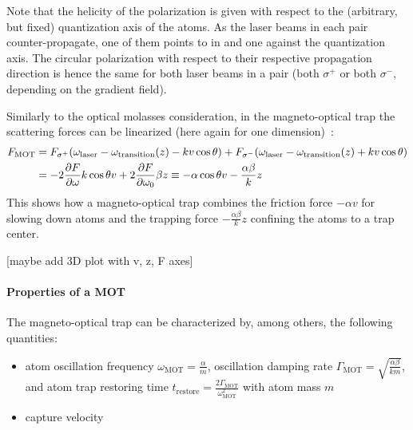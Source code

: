 Note that the helicity of the polarization is given with respect to the (arbitrary, but fixed) quantization axis of the atoms. As the laser beams in each pair counter-propagate, one of them points to in and one against the quantization axis. The circular polarization with respect to their respective propagation direction is hence the same for both laser beams in a pair (both $\sigma^+$ or both $\sigma^-$, depending on the gradient field).


Similarly to the optical molasses consideration, in the magneto-optical trap the scattering forces can be linearized (here again for one dimension)~\cite{foot_atomic_2005}:
\begin{equation}
    \begin{split}
        F_\text{MOT} &= F_{\sigma^+}(\omega_\text{laser} - \omega_\text{transition}(z) - kv \cos \theta) + F_{\sigma^-}(\omega_\text{laser} - \omega_\text{transition}(z) + kv \cos \theta)\\
        &= -2 \pdv{F}{\omega} k\cos \theta v + 2 \pdv{F}{\omega_0} \beta z  \equiv - \alpha \cos \theta v - \frac{\alpha \beta}{k} z
    \end{split}
\end{equation}
This shows how a magneto-optical trap combines the friction force $- \alpha v$ for slowing down atoms and the trapping force $- \frac{\alpha \beta}{k} z$ confining the atoms to a trap center.

[maybe add 3D plot with v, z, F axes]

\paragraph{Properties of a MOT}
The magneto-optical trap can be characterized by, among others, the following quantities:
\begin{itemize}
    \item atom oscillation frequency $\omega_\text{MOT} = \frac{\alpha}{m}$, oscillation damping rate $\Gamma_\text{MOT} = \sqrt{\frac{\alpha \beta}{km}}$, and atom trap restoring time $t_\text{restore} = \frac{2\Gamma_\text{MOT}}{\omega_\text{MOT}^2}$ with atom mass $m$~\cite{metcalf_laser_1999}
    \item capture velocity
\end{itemize}

